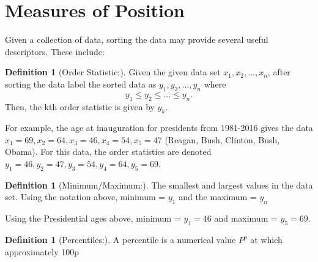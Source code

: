 \documentclass[10pt,]{book}
\theoremstyle{plain}
\theoremstyle{definition}
\newtheorem{definition}[theorem]{Definition}
\theoremstyle{definition}
\theoremstyle{definition}
\numberwithin{equation}{section}
\begin{document}
\section[{Measures of Position}]{Measures of Position}\label{section-6}
Given a collection of data, sorting the data may provide several useful descriptors. These include:
\begin{definition}[{Order Statistic:}]\label{definition-1}
Given the given data set \(x_1, x_2, ... , x_n\), after sorting the data label the sorted data as \(y_1, y_2, ..., y_n\) where  
	\begin{equation*} y_1 \le y_2 \le ... \le y_n.\end{equation*} 
	Then, the kth order statistic is given by \(y_k\). %
\end{definition}
\par

	For example, the age at inauguration for presidents from 1981-2016 gives the data \(x_1 = 69, x_2 = 64, x_3 = 46, x_4 = 54, x_5 = 47\) (Reagan, Bush, Clinton, Bush, Obama). For this data, the order statistics are denoted \(y_1 = 46, y_2 = 47, y_3 = 54, y_4 = 64, y_5 = 69\).
\begin{definition}[{Minimum/Maximum:}]\label{definition-2}
The smallest and largest values in the data set. Using the notation above, minimum = \(y_1\) and the maximum = \(y_n\)%
\end{definition}
\par

	Using the Presidential ages above, minimum = \(y_1 = 46\) and maximum = \(y_5 = 69\).
\begin{definition}[{Percentiles:}]\label{definition-3}
A percentile is a numerical value \(P^p\) at which approximately 100p%
\end{definition}
\par
\end{document}
